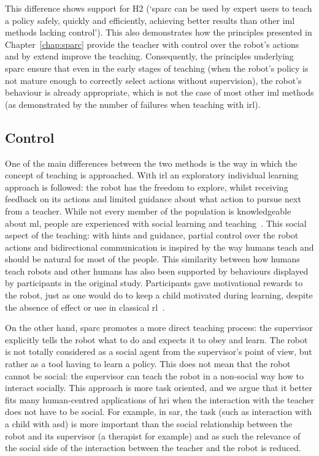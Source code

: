 This difference shows support for H2 (`\gls{sparc} can be used by expert users to teach a policy safely, quickly and efficiently, achieving better results than other \gls{iml} methods lacking control'). This also demonstrates how the principles presented in Chapter~\ref{chap:sparc} provide the teacher with control over the robot's actions and by extend improve the teaching. Consequently, the principles underlying \gls{sparc} ensure that even in the early stages of teaching (when the robot's policy is not mature enough to correctly select actions without supervision), the robot's behaviour is already appropriate, which is not the case of most other \gls{iml} methods (as demonstrated by the number of failures when teaching with \gls{irl}).

\subsection{Control}

\label{ssec:control_control}

One of the main differences between the two methods is the way in which the concept of teaching is approached. With \gls{irl} an exploratory individual learning approach is followed: the robot has the freedom to explore, whilst receiving feedback on its actions and limited guidance about what action to pursue next from a teacher. While not every member of the population is knowledgeable about \gls{ml}, people are experienced with social learning and teaching~\citep{thomaz2008teachable}. This social aspect of the teaching: with hints and guidance, partial control over the robot actions and bidirectional communication is inspired by the way humans teach and should be natural for most of the people. This similarity between how humans teach robots and other humans has also been supported by behaviours displayed by participants in the original study. Participants gave motivational rewards to the robot, just as one would do to keep a child motivated during learning, despite the absence of effect or use in classical \gls{rl}~\citep{thomaz2008teachable}.

On the other hand, \gls{sparc} promotes a more direct teaching process: the supervisor explicitly tells the robot what to do and expects it to obey and learn. The robot is not totally considered as a social agent from the supervisor's point of view, but rather as a tool having to learn a policy. This does not mean that the robot cannot be social: the supervisor can teach the robot in a non-social way how to interact socially. This approach is more task oriented, and we argue that it better fits many human-centred applications of \gls{hri} when the interaction with the teacher does not have to be social. For example, in \gls{sar}, the task (such as interaction with a child with \gls{asd}) is more important than the social relationship between the robot and its supervisor (a therapist for example) and as such the relevance of the social side of the interaction between the teacher and the robot is reduced.

